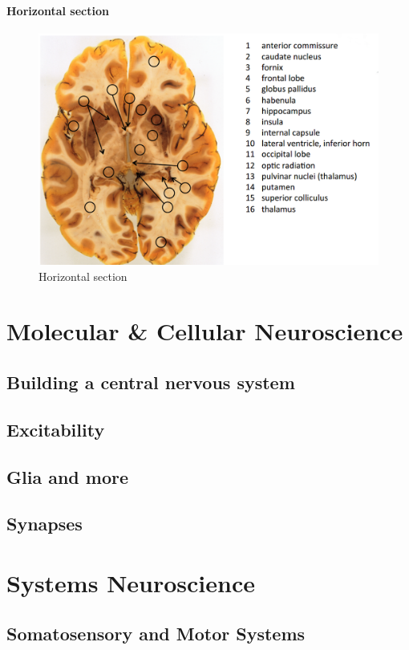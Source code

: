 \documentclass[12pt,article,oneside,a4paper]{memoir}
\begin{document}
\paragraph{Horizontal section}
\begin{figure}[H]
	\centering
  	\includegraphics[width=\linewidth]{imgs/horizontal-section.png}
	\caption{Horizontal section}
  	\label{fig:coronalSectionI}
\end{figure}



\section{Molecular \& Cellular Neuroscience}
\subsection{Building a central nervous system}
\subsection{Excitability}
\subsection{Glia and more}
\subsection{Synapses}

\section{Systems Neuroscience}
\subsection{Somatosensory and Motor Systems}
\end{document}
